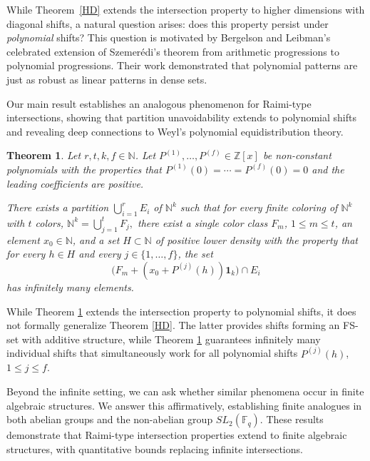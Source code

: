 \documentclass[11pt]{article}
\newtheorem{theorem}{Theorem}[section]
\def\Z{{\mathbb  Z}}
\def \Z{{\mathbb Z}}
\theoremstyle{definition}
\begin{document}
While Theorem~\ref{HD} extends the intersection property to higher dimensions with diagonal shifts, a natural question arises: does this property persist under \emph{polynomial} shifts? This question is motivated by Bergelson and Leibman's celebrated extension \cite{BL} of Szemer\'edi's theorem from arithmetic progressions to polynomial progressions. Their work demonstrated that polynomial patterns are just as robust as linear patterns in dense sets. 

Our main result establishes an analogous phenomenon for Raimi-type intersections, showing that partition unavoidability extends to polynomial shifts and revealing deep connections to Weyl's polynomial equidistribution theory.

\begin{theorem}\label{thmpolynomial-main}
Let $r, t, k, f\in \mathbb{N}$.
Let $P^{(1)},\dots,P^{(f)}\in\Z[x]$ be non-constant polynomials with the properties that $P^{(1)}(0)=\cdots=P^{(f)}(0)=0$ and the leading coefficients are positive. 

There exists a partition
$\bigcup_{i=1}^rE_i$ of $\mathbb{N}^k$ such that for every finite coloring of $\mathbb{N}^k$ with $t$ colors,
$
\mathbb{N}^k = \bigcup_{j=1}^t F_j,
$ there exist a single color class $F_m$, $1\le m\le t$, an element $x_0\in \mathbb{N}$, and a set $H\subset\mathbb{N}$ of positive lower density with the property that for every $h\in H$ and every $j\in\{1,\dots,f\}$, the set
\[
\big(F_m+(x_0+P^{(j)}(h))\mathbf{1}_k\big)\cap E_i
\]
has infinitely many elements.
\end{theorem}


While Theorem \ref{thmpolynomial-main} extends the intersection property to polynomial shifts, it does not formally generalize Theorem \ref{HD}. The latter provides shifts forming an FS-set with additive structure, while Theorem \ref{thmpolynomial-main} guarantees infinitely many individual shifts that simultaneously work for all polynomial shifts $P^{(j)}(h)$, $1\le j\le f$.
\smallskip

Beyond the infinite setting, we can ask whether similar phenomena occur in finite algebraic structures. We answer this affirmatively, establishing finite analogues in both abelian groups and the non-abelian group $SL_2(\mathbb{F}_q)$. These results demonstrate that Raimi-type intersection properties extend to finite algebraic structures, with quantitative bounds replacing infinite intersections.
\end{document}
